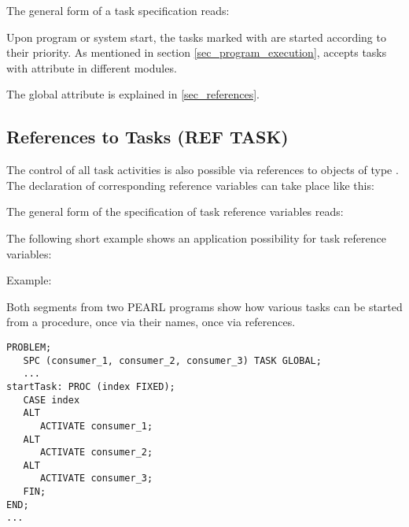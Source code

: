 The general form of a task specification reads:

\begin{grammarframe}
\end{grammarframe}


Upon program or system start, the tasks marked with  are started
according to their priority. 
As mentioned in section \ref{sec_program_execution}, \OpenPEARL{} 
accepts tasks with  attribute in different modules.

The global attribute is explained in \ref{sec_references}.

\subsection{References to Tasks (REF TASK)}   %
\label{sec_ref_task}

The control of all task activities is also possible via references to
objects of type . The declaration of corresponding reference
variables can take place like this:

\begin{grammarframe}
\end{grammarframe}

The general form of the specification of task reference variables reads:

\begin{grammarframe}
\end{grammarframe}

The following short example shows an application possibility for task
reference variables:

Example:

Both segments from two PEARL programs show how various tasks can be
started from a procedure, once via their names, once via references.

\begin{lstlisting}
PROBLEM;
   SPC (consumer_1, consumer_2, consumer_3) TASK GLOBAL;
   ...
startTask: PROC (index FIXED);
   CASE index 
   ALT
      ACTIVATE consumer_1;
   ALT
      ACTIVATE consumer_2;
   ALT
      ACTIVATE consumer_3;
   FIN;
END;
...
\end{lstlisting}

